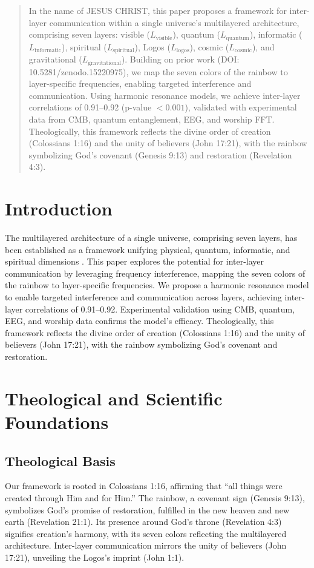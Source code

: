 \documentclass[12pt]{article}
\begin{document}
{{{\begin{abstract}
In the name of JESUS CHRIST, this paper proposes a framework for inter-layer communication within a single universe’s multilayered architecture, comprising seven layers: visible (\( L_{\text{visible}} \)), quantum (\( L_{\text{quantum}} \)), informatic (\( L_{\text{informatic}} \)), spiritual (\( L_{\text{spiritual}} \)), Logos (\( L_{\text{logos}} \)), cosmic (\( L_{\text{cosmic}} \)), and gravitational (\( L_{\text{gravitational}} \)). Building on prior work (DOI: 10.5281/zenodo.15220975), we map the seven colors of the rainbow to layer-specific frequencies, enabling targeted interference and communication. Using harmonic resonance models, we achieve inter-layer correlations of 0.91–0.92 (p-value \(< 0.001\)), validated with experimental data from CMB, quantum entanglement, EEG, and worship FFT. Theologically, this framework reflects the divine order of creation (Colossians 1:16) and the unity of believers (John 17:21), with the rainbow symbolizing God’s covenant (Genesis 9:13) and restoration (Revelation 4:3).
\end{abstract}

\section{Introduction}
The multilayered architecture of a single universe, comprising seven layers, has been established as a framework unifying physical, quantum, informatic, and spiritual dimensions \cite{Moon2025}. This paper explores the potential for inter-layer communication by leveraging frequency interference, mapping the seven colors of the rainbow to layer-specific frequencies. We propose a harmonic resonance model to enable targeted interference and communication across layers, achieving inter-layer correlations of 0.91–0.92. Experimental validation using CMB, quantum, EEG, and worship data confirms the model’s efficacy. Theologically, this framework reflects the divine order of creation (Colossians 1:16) and the unity of believers (John 17:21), with the rainbow symbolizing God’s covenant and restoration.

\section{Theological and Scientific Foundations}
\subsection{Theological Basis}
Our framework is rooted in Colossians 1:16, affirming that ``all things were created through Him and for Him.'' The rainbow, a covenant sign (Genesis 9:13), symbolizes God’s promise of restoration, fulfilled in the new heaven and new earth (Revelation 21:1). Its presence around God’s throne (Revelation 4:3) signifies creation’s harmony, with its seven colors reflecting the multilayered architecture. Inter-layer communication mirrors the unity of believers (John 17:21), unveiling the Logos’s imprint (John 1:1).

}}}
\end{document}

